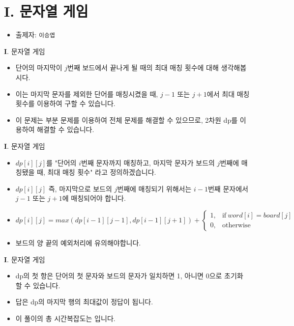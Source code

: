\section{I. 문자열 게임}

\begin{frame} %
    \begin{itemize}
        \item 출제자: \texttt{이승엽}
    \end{itemize}
\end{frame}

\begin{frame}{\textbf{I}. 문자열 게임}
\begin{itemize}
	\item 단어의 마지막이 $j$번째 보드에서 끝나게 될 때의 최대 매칭 횟수에 대해 생각해봅시다.
	\item 이는 마지막 문자를 제외한 단어를 매칭시켰을 때, $j - 1$ 또는 $j + 1$에서 최대 매칭 횟수를 이용하여 구할 수 있습니다.
	\item 이 문제는 부분 문제를 이용하여 전체 문제를 해결할 수 있으므로, 2차원 dp를 이용하여 해결할 수 있습니다.
\end{itemize}
\end{frame}

\begin{frame}{\textbf{I}. 문자열 게임}
	\begin{itemize}
		\item $dp[i][j]$를 "단어의 $i$번째 문자까지 매칭하고, 마지막 문자가 보드의 $j$번째에 매칭됐을 때, 최대 매칭 횟수" 라고 정의하겠습니다.
		\item $dp[i][j]$ 즉, 마지막으로 보드의 $j$번째에 매칭되기 위해서는 $i - 1$번째 문자에서 $j - 1$ 또는 $j + 1$에 매칭되어야 합니다.
		\item $dp[i][j] = max(dp[i - 1][j - 1], dp[i - 1][j + 1]) + \begin{cases}
			1, & \text{if}\ word[i] = board[j] \\
			0, & \text{otherwise}
		\end{cases} $
		\item 보드의 양 끝의 예외처리에 유의해야합니다.
	\end{itemize}
\end{frame}

\begin{frame}{\textbf{I}. 문자열 게임}
	\begin{itemize}
		\item dp의 첫 항은 단어의 첫 문자와 보드의 문자가 일치하면 1, 아니면 0으로 초기화 할 수 있습니다.
		\item 답은 dp의 마지막 행의 최대값이 정답이 됩니다.
		\item 이 풀이의 총 시간복잡도는 입니다.
	\end{itemize}
\end{frame}